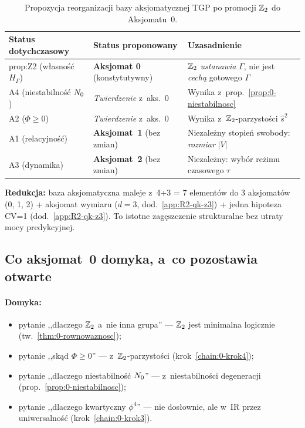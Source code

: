 \begin{table}[h]
\centering
\begin{tabular}{lll}
\toprule
Status dotychczasowy & Status proponowany & Uzasadnienie \\
\midrule
prop:Z2 (w\l{}asno\'s\'c $H_\Gamma$) &
  \textbf{Aksjomat 0} (konstytutywny) &
  $\mathbb{Z}_2$ \emph{ustanawia} $\Gamma$, nie jest \emph{cech\k{a}}
  gotowego $\Gamma$ \\
A4 (niestabilność $N_0$) &
  \emph{Twierdzenie} z~aks.~0 &
  Wynika z~prop.~\ref{prop:0-niestabilnosc} \\
A2 ($\Phi \geq 0$) &
  \emph{Twierdzenie} z~aks.~0 &
  Wynika z~$\mathbb{Z}_2$-parzysto\'sci $\hat{s}^2$ \\
A1 (relacyjno\'s\'c) &
  \textbf{Aksjomat~1} (bez zmian) &
  Niezale\.zny stopień swobody: \emph{rozmiar} $|V|$ \\
A3 (dynamika) &
  \textbf{Aksjomat~2} (bez zmian) &
  Niezale\.zny: wyb\'or re\.zimu czasowego $\tau$ \\
\bottomrule
\end{tabular}
\caption{Propozycja reorganizacji bazy aksjomatycznej TGP po
promocji $\mathbb{Z}_2$ do Aksjomatu~0.}
\label{tab:0-reorganizacja}
\end{table}

\textbf{Redukcja:} baza aksjomatyczna maleje z~4+3 = 7 element\'ow
do 3 aksjomat\'ow (0, 1, 2) + aksjomat wymiaru ($d=3$, dod.~\ref{app:R2-qk-z3})
+ jedna hipoteza CV=1 (dod.~\ref{app:R2-qk-z3}). To istotne zag\k{e}szczenie
strukturalne bez utraty mocy predykcyjnej.

\subsection{Co aksjomat~0 domyka, a~co pozostawia otwarte}%
\label{app:0-otwarte}

\paragraph{Domyka:}
\begin{itemize}[nosep]
  \item pytanie ,,dlaczego $\mathbb{Z}_2$ a~nie inna grupa'' ---
    $\mathbb{Z}_2$ jest minimalna logicznie (tw.~\ref{thm:0-rownowaznosc});
  \item pytanie ,,sk\k{a}d $\Phi \geq 0$'' ---
    z~$\mathbb{Z}_2$-parzysto\'sci (krok~\ref{chain:0-krok4});
  \item pytanie ,,dlaczego niestabilność $N_0$'' ---
    z~niestabilności degeneracji (prop.~\ref{prop:0-niestabilnosc});
  \item pytanie ,,dlaczego kwartyczny $\phi^4$'' ---
    nie dos\l{}ownie, ale w~IR przez uniwersalno\'s\'c
    (krok~\ref{chain:0-krok3}).
\end{itemize}

